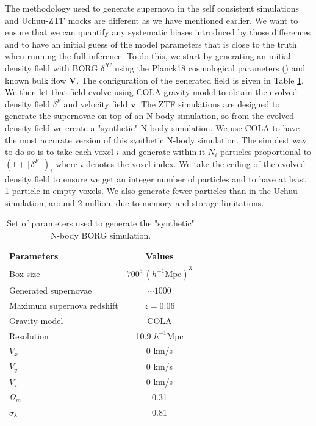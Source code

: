 The methodology used to generate supernova in the self consistent simulations and Uchuu-ZTF mocks are different as 
we have mentioned earlier. We want to ensure that we can 
quantify any systematic biases introduced by those differences and to have an initial guess of the model parameters that is close to the truth when running the full inference. 
To do this, we start by generating an initial density field with BORG $\delta^{IC}$ using the 
Planck18 cosmological parameters (\cite{Planck_2018_params}) and known bulk flow $\mathbf{V}$. 
The configuration of the generated field is given in Table \ref{tab:borg_nbody}. 
We then let that field evolve using COLA gravity model to obtain the evolved density field 
$\delta^{F}$ and velocity field $\mathbf{v}$. The ZTF simulations are designed to generate the supernovae on top of an N-body simulation, so 
from the evolved density field we create a "synthetic" N-body simulation. We use COLA to have the most accurate version of this synthetic N-body simulation. 
The simplest way to do so is to take each voxel-$i$ and generate within it $N_i$ particles proportional 
to $(1+\lceil \delta^{F}\rceil )_i$ where $i$ denotes the voxel index.
 We take the ceiling of the evolved density field to ensure we get an integer number of 
particles and to have at least 1 particle in empty voxels. We also generate fewer particles than in the Uchuu simulation, 
around 2 million, due to memory and storage limitations. \\

\begin{table}[ht]
    \centering
    \caption{Set of parameters used to generate the "synthetic" N-body BORG simulation.}
    \label{tab:borg_nbody}
    \begin{tabular}{|l|c|}
        \hline
        Parameters & Values \\
        \hline
        Box size & $700^3 \, (h^{-1}\text{Mpc})^3$ \\
        Generated supernovae & $\sim 1000$ \\
        Maximum supernova redshift & $z=0.06$ \\
        Gravity model & COLA \\
        Resolution & 10.9 $h^{-1}\text{Mpc}$ \\
        $V_x$ & 0 km/s \\
        $V_y$ & 0 km/s \\
        $V_z$ & 0 km/s \\
        $\Omega_m$ & 0.31 \\
        $\sigma_8$ & 0.81 \\
        \hline
    \end{tabular}
\end{table}

